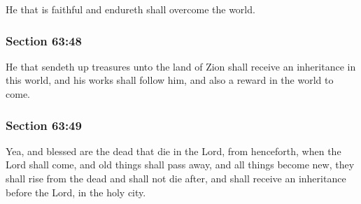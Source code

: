		He that is faithful and endureth shall overcome the world.


	\subsubsection{Section 63:48} %
		\label{DC63-48}

		He that sendeth up treasures unto the land of Zion shall receive an inheritance in this world, and his works shall follow him, and also a reward in the world to come.


	\subsubsection{Section 63:49} %
		\label{DC63-49}

		Yea, and blessed are the dead that die in the Lord, from henceforth, when the Lord shall come, and old things shall pass away, and all things become new, they shall rise from the dead and shall not die after, and shall receive an inheritance before the Lord, in the holy city.


